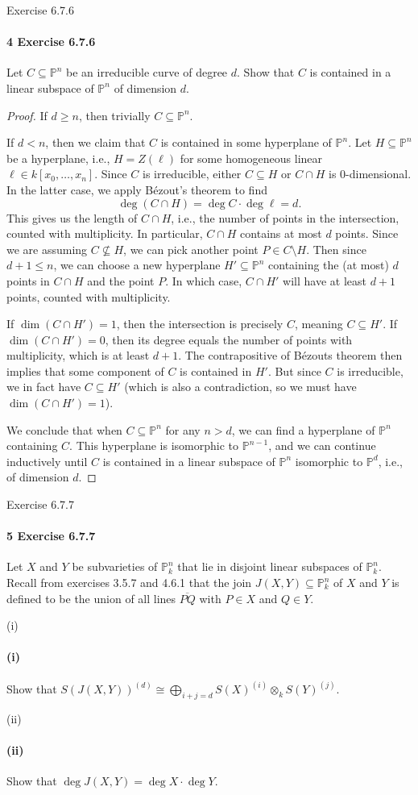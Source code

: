 \documentclass[12pt]{article}
\newlength{\myparskip}
\newenvironment{fullbox}{\begin{lrbox}{\savefullbox}\begin{minipage}{\dimexpr\textwidth-2\fboxsep\relax}\setlength{\parskip}{\myparskip}}{\end{minipage}\end{lrbox}\framebox[\textwidth]{\usebox{\savefullbox}}}
\newenvironment{pbox}[1][]{\begin{fullbox}\ifx#1\empty\else\paragraph{#1}\phantom{}\fi}{\end{fullbox}}
\theoremstyle{definition}
\renewcommand{\P}{\mathbb{P}}
\newcommand{\<}{\langle}
\renewcommand{\>}{\rangle}
\newcommand{\isom}{\cong}
\newcommand{\seq}{\subseteq}
\newcommand{\tensor}{\otimes}
\begin{document}
\newpage
\begin{pbox}[4 Exercise 6.7.6]
    Let $C \seq \P^n$ be an irreducible curve of degree $d$.
    Show that $C$ is contained in a linear subspace of $\P^n$ of dimension $d$.
\end{pbox}

\begin{proof}
    If $d \geq n$, then trivially $C \seq \P^n$.

    If $d < n$, then we claim that $C$ is contained in some hyperplane of $\P^n$.
    Let $H \seq \P^n$ be a hyperplane, i.e., $H = Z(\ell)$ for some homogeneous linear $\ell \in k[x_0, \dots, x_n]$.
    Since $C$ is irreducible, either $C \seq H$ or $C \cap H$ is $0$-dimensional.
    In the latter case, we apply B\'ezout's theorem to find
    \[
        \deg(C \cap H) = \deg C \cdot \deg \ell = d.
    \]
    This gives us the length of $C \cap H$, i.e., the number of points in the intersection, counted with multiplicity.
    In particular, $C \cap H$ contains at most $d$ points.
    Since we are assuming $C \nsubseteq H$, we can pick another point $P \in C \setminus H$.
    Then since $d + 1 \leq n$, we can choose a new hyperplane $H' \seq \P^n$ containing the (at most) $d$ points in $C \cap H$ and the point $P$.
    In which case, $C \cap H'$ will have at least $d + 1$ points, counted with multiplicity.
    
    If $\dim(C \cap H') = 1$, then the intersection is precisely $C$, meaning $C \seq H'$.
    If $\dim(C \cap H') = 0$, then its degree equals the number of points with multiplicity, which is at least $d + 1$.
    The contrapositive of B\'ezouts theorem then implies that some component of $C$ is contained in $H'$.
    But since $C$ is irreducible, we in fact have $C \subseteq H'$ (which is also a contradiction, so we must have $\dim(C \cap H') = 1$).

    We conclude that when $C \seq \P^n$ for any $n > d$, we can find a hyperplane of $\P^n$ containing $C$.
    This hyperplane is isomorphic to $\P^{n-1}$, and we can continue inductively until $C$ is contained in a linear subspace of $\P^n$ isomorphic to $\P^d$, i.e., of dimension $d$.
\end{proof}



\newpage
\begin{pbox}[5 Exercise 6.7.7]
    Let $X$ and $Y$ be subvarieties of $\P_k^n$ that lie in disjoint linear subspaces of $\P_k^n$.
    Recall from exercises 3.5.7 and 4.6.1 that the join $J(X, Y) \seq \P_k^n$ of $X$ and $Y$ is defined to be the union of all lines $\overline{PQ}$ with $P \in X$ and $Q \in Y$.
\end{pbox}

\begin{pbox}[(i)]
    Show that $S(J(X, Y))^{(d)} \isom \bigoplus_{i+j=d} S(X)^{(i)} \tensor_k S(Y)^{(j)}$.
\end{pbox}

\begin{pbox}[(ii)]
    Show that $\deg J(X, Y) = \deg X \cdot \deg Y$.
\end{pbox}
\end{document}
